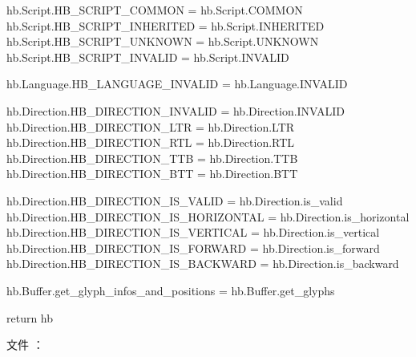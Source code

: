 \begin{typing}
hb.Script.HB_SCRIPT_COMMON    = hb.Script.COMMON
hb.Script.HB_SCRIPT_INHERITED = hb.Script.INHERITED
hb.Script.HB_SCRIPT_UNKNOWN   = hb.Script.UNKNOWN
hb.Script.HB_SCRIPT_INVALID   = hb.Script.INVALID

hb.Language.HB_LANGUAGE_INVALID = hb.Language.INVALID

hb.Direction.HB_DIRECTION_INVALID = hb.Direction.INVALID
hb.Direction.HB_DIRECTION_LTR = hb.Direction.LTR
hb.Direction.HB_DIRECTION_RTL = hb.Direction.RTL
hb.Direction.HB_DIRECTION_TTB = hb.Direction.TTB
hb.Direction.HB_DIRECTION_BTT = hb.Direction.BTT

hb.Direction.HB_DIRECTION_IS_VALID = hb.Direction.is_valid
hb.Direction.HB_DIRECTION_IS_HORIZONTAL = hb.Direction.is_horizontal
hb.Direction.HB_DIRECTION_IS_VERTICAL = hb.Direction.is_vertical
hb.Direction.HB_DIRECTION_IS_FORWARD = hb.Direction.is_forward
hb.Direction.HB_DIRECTION_IS_BACKWARD = hb.Direction.is_backward

hb.Buffer.get_glyph_infos_and_positions = hb.Buffer.get_glyphs

return hb

\end{typing}

\medskip

文件 ：


